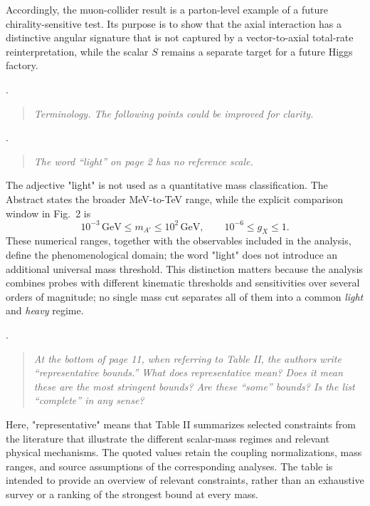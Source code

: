 \documentclass[12pt,a4paper]{article}
\begin{document}
Accordingly, the muon-collider result is a parton-level example of a future chirality-sensitive test. Its purpose is to show that the axial interaction has a distinctive angular signature that is not captured by a vector-to-axial total-rate reinterpretation, while the scalar \(S\) remains a separate target for a future Higgs factory.

\medskip
{}. \begin{quote}\itshape
Terminology. The following points could be improved for clarity.
\end{quote}

\medskip
{}. \begin{quote}\itshape
The word ``light'' on page 2 has no reference scale.
\end{quote}

The adjective "light" is not used as a quantitative mass classification. The Abstract states the broader MeV-to-TeV range, while the explicit comparison window in Fig.~2 is
\[
10^{-3}\,\mathrm{GeV}\leq m_{A'}\leq10^2\,\mathrm{GeV},
\qquad
10^{-6}\leq g_X\leq1.
\]
These numerical ranges, together with the observables included in the analysis, define the phenomenological domain; the word "light" does not introduce an additional universal mass threshold. This distinction matters because the analysis combines probes with different kinematic thresholds and sensitivities over several orders of magnitude; no single mass cut separates all of them into a common \emph{light} and \emph{heavy} regime.

\medskip
{}. \begin{quote}\itshape
At the bottom of page 11, when referring to Table II, the authors write ``representative bounds.'' What does representative mean? Does it mean these are the most stringent bounds? Are these ``some'' bounds? Is the list ``complete'' in any sense?
\end{quote}

Here, "representative" means that Table II summarizes selected constraints from the literature that illustrate the different scalar-mass regimes and relevant physical mechanisms. The quoted values retain the coupling normalizations, mass ranges, and source assumptions of the corresponding analyses. The table is intended to provide an overview of relevant constraints, rather than an exhaustive survey or a ranking of the strongest bound at every mass.
\end{document}
